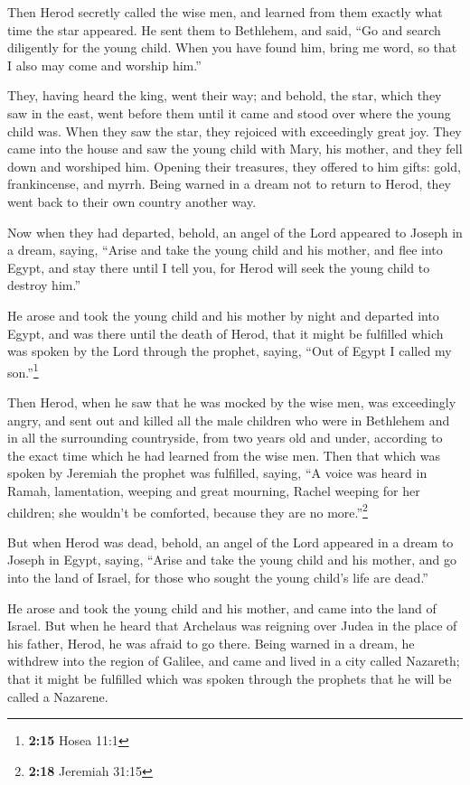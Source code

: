  Then Herod secretly called the wise men, and learned from
them exactly what time the star appeared.  He sent them to
Bethlehem, and said, ``Go and search diligently for the young child.
When you have found him, bring me word, so that I also may come and
worship him.''

 They, having heard the king, went their way; and behold,
the star, which they saw in the east, went before them until it came and
stood over where the young child was.  When they saw the
star, they rejoiced with exceedingly great joy.  They
came into the house and saw the young child with Mary, his mother, and
they fell down and worshiped him. Opening their treasures, they offered
to him gifts: gold, frankincense, and myrrh.  Being
warned in a dream not to return to Herod, they went back to their own
country another way.

 Now when they had departed, behold, an angel of the Lord
appeared to Joseph in a dream, saying, ``Arise and take the young child
and his mother, and flee into Egypt, and stay there until I tell you,
for Herod will seek the young child to destroy him.''

 He arose and took the young child and his mother by
night and departed into Egypt,  and was there until the
death of Herod, that it might be fulfilled which was spoken by the Lord
through the prophet, saying, ``Out of Egypt I called my
son.''\footnote{\textbf{2:15} Hosea 11:1}

 Then Herod, when he saw that he was mocked by the wise
men, was exceedingly angry, and sent out and killed all the male
children who were in Bethlehem and in all the surrounding countryside,
from two years old and under, according to the exact time which he had
learned from the wise men.  Then that which was spoken by
Jeremiah the prophet was fulfilled, saying,  ``A voice
was heard in Ramah, lamentation, weeping and great mourning, Rachel
weeping for her children; she wouldn't be comforted, because they are no
more.''\footnote{\textbf{2:18} Jeremiah 31:15}

 But when Herod was dead, behold, an angel of the Lord
appeared in a dream to Joseph in Egypt, saying,  ``Arise
and take the young child and his mother, and go into the land of Israel,
for those who sought the young child's life are dead.''

 He arose and took the young child and his mother, and
came into the land of Israel.  But when he heard that
Archelaus was reigning over Judea in the place of his father, Herod, he
was afraid to go there. Being warned in a dream, he withdrew into the
region of Galilee,  and came and lived in a city called
Nazareth; that it might be fulfilled which was spoken through the
prophets that he will be called a Nazarene.

